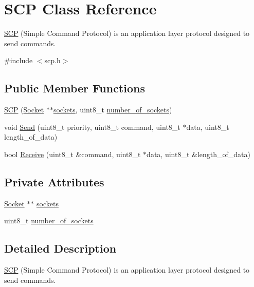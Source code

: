\hypertarget{class_s_c_p}{}\section{S\+CP Class Reference}
\label{class_s_c_p}


\hyperlink{class_s_c_p}{S\+CP} (Simple Command Protocol) is an application layer protocol designed to send commands.  




{\ttfamily \#include $<$scp.\+h$>$}

\subsection*{Public Member Functions}
\begin{DoxyCompactItemize}
\item 
\hyperlink{class_s_c_p_aee0663a84b05a63993f1c3ff3a952319}{S\+CP} (\hyperlink{class_socket}{Socket} $\ast$$\ast$\hyperlink{class_s_c_p_a47df7b56ee4f566f9a59198eaf8e52e7}{sockets}, uint8\+\_\+t \hyperlink{class_s_c_p_a60870833801da77a079ebed8383c91bf}{number\+\_\+of\+\_\+sockets})
\item 
void \hyperlink{class_s_c_p_a02460c47705c42c2ade1608007d7966a}{Send} (uint8\+\_\+t priority, uint8\+\_\+t command, uint8\+\_\+t $\ast$data, uint8\+\_\+t length\+\_\+of\+\_\+data)
\item 
bool \hyperlink{class_s_c_p_ab01a551b8edf803faaea5b0310345498}{Receive} (uint8\+\_\+t \&command, uint8\+\_\+t $\ast$data, uint8\+\_\+t \&length\+\_\+of\+\_\+data)
\end{DoxyCompactItemize}
\subsection*{Private Attributes}
\begin{DoxyCompactItemize}
\item 
\hyperlink{class_socket}{Socket} $\ast$$\ast$ \hyperlink{class_s_c_p_a47df7b56ee4f566f9a59198eaf8e52e7}{sockets}
\item 
uint8\+\_\+t \hyperlink{class_s_c_p_a60870833801da77a079ebed8383c91bf}{number\+\_\+of\+\_\+sockets}
\end{DoxyCompactItemize}


\subsection{Detailed Description}
\hyperlink{class_s_c_p}{S\+CP} (Simple Command Protocol) is an application layer protocol designed to send commands. 

